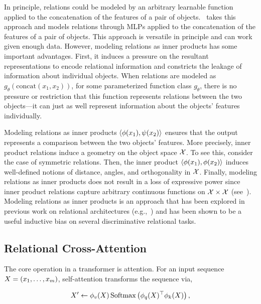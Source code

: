 In principle, relations could be modeled by an arbitrary learnable function applied to the concatenation of the features of a pair of objects.~\citep{santoro1} takes this approach and models relations through MLPs applied to the concatenation of the features of a pair of objects. This approach is versatile in principle and can work given enough data. However, modeling relations as inner products has some important advantages. First, it induces a pressure on the resultant representations to encode relational information and constricts the leakage of information about individual objects. When relations are modeled as $g_\theta(\mathrm{concat}(x_1, x_2))$, for some parameterized function class $g_\theta$, there is no pressure or restriction that this function represents relations between the two objects---it can just as well represent information about the objects' features individually.

Modeling relations as inner products $\left \langle \phi(x_1), \psi(x_2) \right\rangle$ ensures that the output represents a comparison between the two objects' features. More precisely, inner product relations induce a geometry on the object space ${\mathcal{X}}$. To see this, consider the case of symmetric relations. Then, the inner product $\left \langle \phi(x_1), \phi(x_2) \right\rangle$ induces well-defined notions of distance, angles, and orthogonality in ${\mathcal{X}}$. Finally, modeling relations as inner products does not result in a loss of expressive power since inner product relations capture arbitrary continuous functions on ${\mathcal{X}} \times {\mathcal{X}}$ (see~). Modeling relations as inner products is an approach that has been explored in previous work on relational architectures (e.g.,~\citep{esbn,kerg2022neural}) and has been shown to be a useful inductive bias on several discriminative relational tasks.

\subsection{Relational Cross-Attention}\label{ssec:relational_crossattention}

The core operation in a transformer is attention. For an input sequence $X = \left(x_1, \ldots, x_m\right)$, self-attention transforms the sequence via,

\begin{equation}\label{eq:self_attn}
    X' \gets \phi_v(X) \, \mathrm{Softmax}\left(\phi_q(X)^\top \phi_k(X)\right),
\end{equation}

